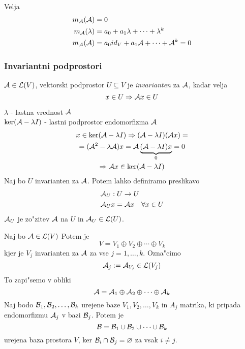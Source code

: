 Velja 
\begin{align*}
m_{\mathcal{A}} (\mathcal{A}) &= 0 \\
m_{\mathcal{A}} (\lambda) &= a_0 + a_1 \lambda + \cdots + \lambda^k \\
m_{\mathcal{A}} (\mathcal{A}) &= a_0 id_V + a_1 \mathcal{A} + \cdots + \mathcal{A}^k = 0
\end{align*}

\subsubsection{Invariantni podprostori}
$\mathcal{A} \in \mathcal{L}(V)$, vektorski podprostor $U \subseteq V$ je \emph{invarianten} za $\mathcal{A}$, kadar velja
\begin{equation*}
x \in U \Rightarrow \mathcal{A} x \in U
\end{equation*}

$\lambda$ - lastna vrednost $\mathcal{A}$\\
$\ker(\mathcal{A} - \lambda I)$ - lastni podprostor endomorfizma $\mathcal{A}$ \\
\begin{gather*}
x \in \ker (\mathcal{A} - \lambda I) \Rightarrow (\mathcal{A} - \lambda I) (\mathcal{A} x) = \\
= (\mathcal{A}^2 - \lambda \mathcal{A}) x = \mathcal{A} \underbrace{(\mathcal{A} - \lambda I)x}_0 = 0 \\
\Rightarrow \mathcal{A} x \in \ker(\mathcal{A} - \lambda I)
\end{gather*}
%
Naj bo $U$ invarianten za $\mathcal{A}$. Potem lahko definiramo preslikavo
\begin{align*}
&\mathcal{A}_U : U \to U \\
&\mathcal{A}_U x = \mathcal{A} x \quad \forall x \in U
\end{align*}
$\mathcal{A}_U$ je zo"zitev $\mathcal{A}$ na $U$ in $\mathcal{A}_U \in \mathcal{L}(U)$.

Naj bo $\mathcal{A} \in \mathcal{L}(V)$ Potem je
\begin{equation*}
V = V_1 \oplus V_2 \oplus \cdots \oplus V_k
\end{equation*}
kjer je $V_j$ invarianten za $\mathcal{A}$ za vse $j = 1, \ldots, k$. Ozna"cimo
\begin{equation*}
\mathcal{A}_j := \mathcal{A}_{V_j} \in \mathcal{L}(V_j)
\end{equation*}
To zapi"semo v obliki
\begin{equation*}
\mathcal{A} = \mathcal{A}_1 \oplus \mathcal{A}_2 \oplus \cdots \oplus \mathcal{A}_k
\end{equation*}
%
Naj bodo $\mathcal{B}_1, \mathcal{B}_2, \ldots, \mathcal{B}_k$ urejene baze $V_1, V_2, \ldots, V_k$ in $A_j$ matrika, ki pripada endomorfizmu $\mathcal{A}_j$ v bazi $\mathcal{B}_j$. Potem je 
\begin{equation*}
\mathcal{B} = \mathcal{B}_1 \cup \mathcal{B}_2 \cup \cdots \cup \mathcal{B}_k
\end{equation*}
urejena baza prostora $V$, ker $\mathcal{B}_i \cap \mathcal{B}_j = \varnothing$ za vsak $i \neq j$.

